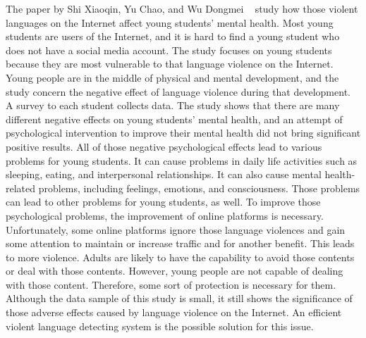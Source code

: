 \documentclass[11pt, natbib=false]{article}
\begin{document}
The paper by Shi Xiaoqin, Yu Chao, and Wu Dongmei ~\cite{shi2021influence} study how those violent languages on the Internet affect young students' mental health.
Most young students are users of the Internet, and it is hard to find a young student who does not have a social media account.
The study focuses on young students because they are most vulnerable to that language violence on the Internet.
Young people are in the middle of physical and mental development, and the study concern the negative effect of language violence during that development.
A survey to each student collects data. The study shows that there are many different negative effects on young students’ mental health, and an attempt of psychological intervention to improve their mental health did not bring significant positive results.
All of those negative psychological effects lead to various problems for young students.
It can cause problems in daily life activities such as sleeping, eating, and interpersonal relationships. It can also cause mental health-related problems, including feelings, emotions, and consciousness.
Those problems can lead to other problems for young students, as well. To improve those psychological problems, the improvement of online platforms is necessary.
Unfortunately, some online platforms ignore those language violences and gain some attention to maintain or increase traffic and for another benefit.
This leads to more violence. Adults are likely to have the capability to avoid those contents or deal with those contents.
However, young people are not capable of dealing with those content. Therefore, some sort of protection is necessary for them.
Although the data sample of this study is small, it still shows the significance of those adverse effects caused by language violence on the Internet.
An efficient violent language detecting system is the possible solution for this issue. 
\end{document}

